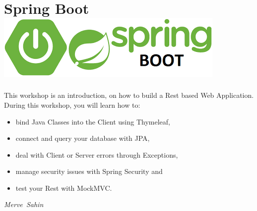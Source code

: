 
\section*{Spring Boot\hfill\includegraphics[width=.5\linewidth]{images/springboot.png}}
This workshop is an introduction, on how to build a Rest based Web Application. During this workshop, you will learn how to: 
\begin{itemize}
\item bind Java Classes into the Client using Thymeleaf,
\item connect and query your database with JPA, 
\item deal with Client or Server errors through Exceptions,
\item manage security issues with Spring Security and
\item test your Rest with MockMVC.
\end{itemize}

\hfill\textit{Merve~Sahin}

